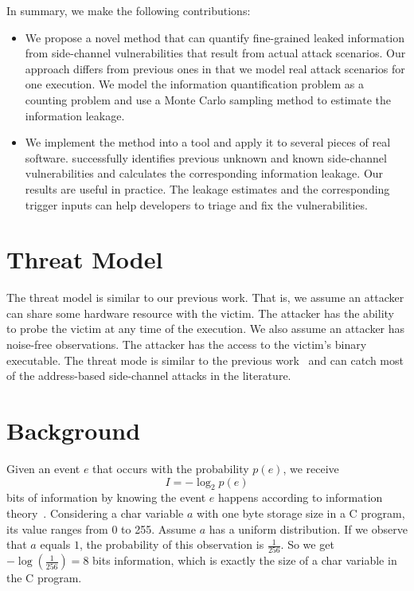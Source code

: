 In summary, we make the following contributions:

\begin{itemize}
    \item We propose a novel method that can quantify fine-grained leaked
          information from side-channel vulnerabilities that result from actual attack
          scenarios. Our approach differs from previous ones in that we
          model real attack scenarios for one execution.
          We model the information quantification problem as a counting problem
          and use a Monte Carlo sampling method to estimate the information leakage.

    \item We implement the method into a tool and apply it
          to several pieces of real software. \tool{} successfully identifies
          previous unknown and known side-channel vulnerabilities and calculates the corresponding information leakage.
          Our results are useful in practice.
          The leakage estimates and the corresponding trigger inputs can
          help developers to triage and fix the vulnerabilities.
\end{itemize}

\section{Threat Model}

The threat model is similar to our previous work. That is, we assume 
an attacker can share some hardware resource with the victim. The attacker has
the ability to probe the victim at any time of the execution. We also assume 
an attacker has noise-free observations. The attacker has the access to the victim's
binary executable. The threat mode is similar to 
the previous work~\cite{203878,182946,Brotzman19Casym} and can catch most of 
the address-based side-channel attacks in the literature.


\section{Background}
Given an event $e$ that occurs with the probability $p(e)$, we receive
\begin{displaymath}
    I = - \log_2p(e)
\end{displaymath}
bits of information by knowing the event $e$ happens according to information theory~\cite{shannon1948mathematical}.
Considering a char variable $a$
with one byte storage size in a C program, its value ranges from 0 to 255.
Assume $a$ has a uniform distribution. If we observe that
$a$ equals $1$, the probability of this observation is $\frac{1}{256}$. So
we get $-\log(\frac{1}{256}) = 8$ bits information, which is exactly the size
of a char variable in the C program.

